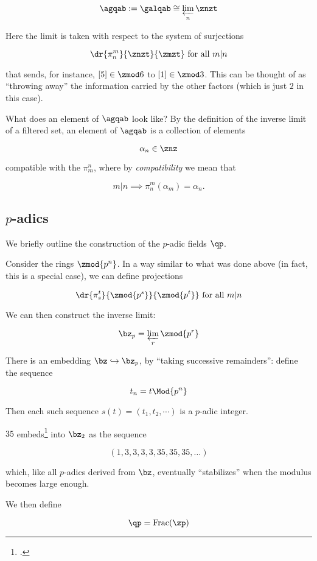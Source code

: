 \[ \agqab := \galqab \cong \varprojlim_n \znzt \]

Here the limit is taken with respect to the system of surjections

\[ \dr {\pi_ n^m} {\znzt} {\zmzt} \text{ for all } m|n \]

that sends, for instance, $[5]\in{\zmod 6}$ to $[1]\in\zmod 3$. This can be
thought of as ``throwing away'' the information carried by the other factors
(which is just $2$ in this case).

What does an element of $\agqab$ look like? By the definition of the inverse
limit of a filtered set, an element of $\agqab$ is a collection of
elements

\[ \alpha_n \in \znz \]

compatible with the $\pi_m^n$, where by
\textit{compatibility} we mean that

\[ m|n \implies \pi_n^m(\alpha_m) = \alpha_n. \]

\subsection{$p$-adics}
We briefly outline the construction of the $p$-adic fields $\qp$.

Consider the rings $\zmod {p^n}$. In a way similar to what was done above (in
fact, this is a special case), we can define projections

\[ \dr {\pi_ s^t} {\zmod {p^s}} {\zmod {p^t}} \text{ for all } m|n \]

We can then construct the inverse limit:

\[ \bz_p = \varprojlim_r \zmod {p^r} \]

There is an embedding $\bz\hookrightarrow\bz_p$, by ``taking successive
remainders'': define the sequence

\[ t_n = t \Mod{p^n} \]

Then each such sequence $s(t) = (t_1, t_2, \cdots)$ is a $p$-adic integer.

\begin{example}
  $35$ embeds\footcite{Wikipedia} into $\bz_2$ as the sequence

  \[  (1, 3, 3, 3, 3, 35, 35, 35, \ldots)\]

  which, like all $p$-adics derived from $\bz$, eventually ``stabilizes'' when
  the modulus becomes large enough.
\end{example}

We then define

\[ \qp = \rm{Frac}(\zp) \]

